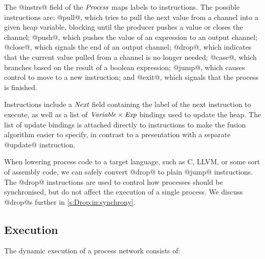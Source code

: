The @instrs@ field of the $\textit{Process}$ maps labels to instructions.
The possible instructions are: @pull@, which tries to pull the next value from a channel into a given heap variable, blocking until the producer pushes a value or closes the channel; @push@, which pushes the value of an expression to an output channel; @close@, which signals the end of an output channel; @drop@, which indicates that the current value pulled from a channel is no longer needed; @case@, which branches based on the result of a boolean expression; @jump@, which causes control to move to a new instruction; and @exit@, which signals that the process is finished.

Instructions include a $\textit{Next}$ field containing the label of the next instruction to execute, as well as a list of $\textit{Variable} \times \textit{Exp}$ bindings used to update the heap.
The list of update bindings is attached directly to instructions to make the fusion algorithm easier to specify, in contrast to a presentation with a separate @update@ instruction.

When lowering process code to a target language, such as C, LLVM, or some sort of assembly code, we can safely convert @drop@ to plain @jump@ instructions.
The @drop@ instructions are used to control how processes should be synchronised, but do not affect the execution of a single process.
We discuss @drop@s further in \autoref{s:Drop:in:synchrony}.




\subsection{Execution}
\label{s:Process:Eval}

The dynamic execution of a process network consists of:

